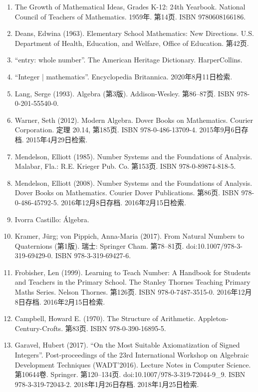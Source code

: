\begin{enumerate}
\item The Growth of Mathematical Ideas, Grades K-12: 24th Yearbook. National Council of Teachers of Mathematics. 1959年. 第14页. ISBN 9780608166186.
\item Deans, Edwina (1963). Elementary School Mathematics: New Directions. U.S. Department of Health, Education, and Welfare, Office of Education. 第42页.
\item “entry: whole number”. The American Heritage Dictionary. HarperCollins.
\item “Integer | mathematics”. Encyclopedia Britannica. 2020年8月11日检索.
\item Lang, Serge (1993). Algebra (第3版). Addison-Wesley. 第86–87页. ISBN 978-0-201-55540-0.
\item Warner, Seth (2012). Modern Algebra. Dover Books on Mathematics. Courier Corporation. 定理 20.14, 第185页. ISBN 978-0-486-13709-4. 2015年9月6日存档. 2015年4月29日检索.
\item Mendelson, Elliott (1985). Number Systems and the Foundations of Analysis. Malabar, Fla.: R.E. Krieger Pub. Co. 第153页. ISBN 978-0-89874-818-5.
\item Mendelson, Elliott (2008). Number Systems and the Foundations of Analysis. Dover Books on Mathematics. Courier Dover Publications. 第86页. ISBN 978-0-486-45792-5. 2016年12月8日存档. 2016年2月15日检索.
\item Ivorra Castillo: Álgebra.
\item Kramer, Jürg; von Pippich, Anna-Maria (2017). From Natural Numbers to Quaternions (第1版). 瑞士: Springer Cham. 第78–81页. doi:10.1007/978-3-319-69429-0. ISBN 978-3-319-69427-6.
\item Frobisher, Len (1999). Learning to Teach Number: A Handbook for Students and Teachers in the Primary School. The Stanley Thornes Teaching Primary Maths Series. Nelson Thornes. 第126页. ISBN 978-0-7487-3515-0. 2016年12月8日存档. 2016年2月15日检索.
\item Campbell, Howard E. (1970). The Structure of Arithmetic. Appleton-Century-Crofts. 第83页. ISBN 978-0-390-16895-5.
\item  Garavel, Hubert (2017). “On the Most Suitable Axiomatization of Signed Integers”. Post-proceedings of the 23rd International Workshop on Algebraic Development Techniques (WADT'2016). Lecture Notes in Computer Science. 第10644卷. Springer. 第120–134页. doi:10.1007/978-3-319-72044-9\_9. ISBN 978-3-319-72043-2. 2018年1月26日存档. 2018年1月25日检索.
\end{enumerate}
